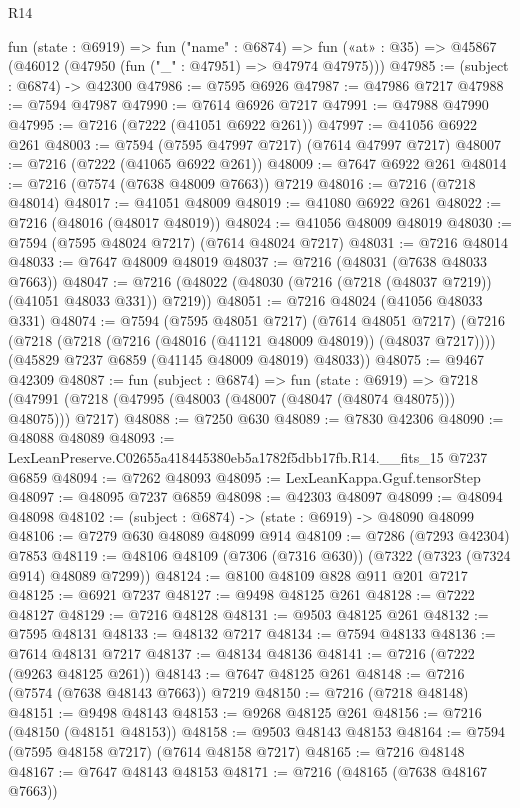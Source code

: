 \begin{lexlean}{R14}
\begin{coremodule}
  fun (state : @6919) =>
  fun ("name" : @6874) =>
  fun («at» : @35) => @45867 (@46012 (@47950 (fun ("_" : @47951) => @47974 @47975)))
@47985 := (subject : @6874) -> @42300
@47986 := @7595 @6926
@47987 := @47986 @7217
@47988 := @7594 @47987
@47990 := @7614 @6926 @7217
@47991 := @47988 @47990
@47995 := @7216 (@7222 (@41051 @6922 @261))
@47997 := @41056 @6922 @261
@48003 := @7594 (@7595 @47997 @7217) (@7614 @47997 @7217)
@48007 := @7216 (@7222 (@41065 @6922 @261))
@48009 := @7647 @6922 @261
@48014 := @7216 (@7574 (@7638 @48009 @7663)) @7219
@48016 := @7216 (@7218 @48014)
@48017 := @41051 @48009
@48019 := @41080 @6922 @261
@48022 := @7216 (@48016 (@48017 @48019))
@48024 := @41056 @48009 @48019
@48030 := @7594 (@7595 @48024 @7217) (@7614 @48024 @7217)
@48031 := @7216 @48014
@48033 := @7647 @48009 @48019
@48037 := @7216 (@48031 (@7638 @48033 @7663))
@48047 := @7216 (@48022 (@48030 (@7216 (@7218 (@48037 @7219)) (@41051 @48033 @331)) @7219))
@48051 := @7216 @48024 (@41056 @48033 @331)
@48074 := @7594
    (@7595 @48051 @7217)
    (@7614 @48051 @7217)
    (@7216
      (@7218 (@7218 (@7216 (@48016 (@41121 @48009 @48019)) (@48037 @7217))))
      (@45829 @7237 @6859 (@41145 @48009 @48019) @48033))
@48075 := @9467 @42309
@48087 := fun (subject : @6874) =>
  fun (state : @6919) =>
  @7218 (@47991 (@7218 (@47995 (@48003 (@48007 (@48047 (@48074 @48075))) @48075))) @7217)
@48088 := @7250 @630
@48089 := @7830 @42306
@48090 := @48088 @48089
@48093 := LexLeanPreserve.C02655a418445380eb5a1782f5dbb17fb.R14.__fits_15 @7237 @6859
@48094 := @7262 @48093
@48095 := LexLeanKappa.Gguf.tensorStep
@48097 := @48095 @7237 @6859
@48098 := @42303 @48097
@48099 := @48094 @48098
@48102 := (subject : @6874) -> (state : @6919) -> @48090 @48099
@48106 := @7279 @630 @48089 @48099 @914
@48109 := @7286 (@7293 @42304) @7853
@48119 := @48106 @48109 (@7306 (@7316 @630)) (@7322 (@7323 (@7324 @914) @48089 @7299))
@48124 := @8100 @48109 @828 @911 @201 @7217
@48125 := @6921 @7237
@48127 := @9498 @48125 @261
@48128 := @7222 @48127
@48129 := @7216 @48128
@48131 := @9503 @48125 @261
@48132 := @7595 @48131
@48133 := @48132 @7217
@48134 := @7594 @48133
@48136 := @7614 @48131 @7217
@48137 := @48134 @48136
@48141 := @7216 (@7222 (@9263 @48125 @261))
@48143 := @7647 @48125 @261
@48148 := @7216 (@7574 (@7638 @48143 @7663)) @7219
@48150 := @7216 (@7218 @48148)
@48151 := @9498 @48143
@48153 := @9268 @48125 @261
@48156 := @7216 (@48150 (@48151 @48153))
@48158 := @9503 @48143 @48153
@48164 := @7594 (@7595 @48158 @7217) (@7614 @48158 @7217)
@48165 := @7216 @48148
@48167 := @7647 @48143 @48153
@48171 := @7216 (@48165 (@7638 @48167 @7663))

\end{coremodule}
\end{lexlean}
